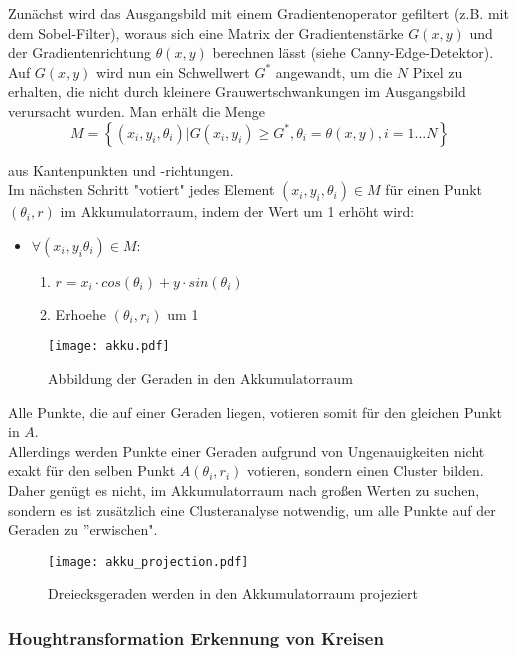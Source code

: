 Zunächst wird das Ausgangsbild mit einem Gradientenoperator gefiltert (z.B. mit dem Sobel-Filter), woraus sich eine Matrix der Gradientenstärke $G(x, y)$ und der Gradientenrichtung $\theta (x, y)$ berechnen lässt (siehe Canny-Edge-Detektor). \\
Auf $G(x, y)$ wird nun ein Schwellwert $G^*$ angewandt, um die $N$ Pixel zu erhalten, die nicht durch kleinere Grauwertschwankungen im Ausgangsbild verursacht wurden.  Man erhält die Menge
\begin{equation*}
M = \left \{ (x_i, y_i, \theta _i) | G(x_i, y_i) \geq G^*, \theta _i=\theta (x, y), i = 1...N \right \}
\end{equation*}

aus Kantenpunkten und -richtungen. \\
Im nächsten Schritt "votiert" jedes Element $(x_i, y_i, \theta_i) \in M$ für einen Punkt $(\theta_i, r)$ im Akkumulatorraum, indem der Wert um 1 erhöht wird:
\begin{itemize}
\item $\forall (x_i, y_i \theta_i) \in M:$
	\begin{enumerate}
		\item $r = x_i \cdot cos(\theta_i) + y \cdot sin(\theta_i)$
		\item {Erhoehe $(\theta_i, r_i)$ um 1}
	\end{enumerate}
\end{itemize}

\begin{figure}[H]
  \begin{center}
    \texttt{[image: akku.pdf]}
    \caption{Abbildung der Geraden in den Akkumulatorraum}
    \label{fig:akku}
  \end{center}
\end{figure}

Alle Punkte, die auf einer Geraden liegen, votieren somit für den gleichen Punkt in $A$. \\ 
Allerdings werden Punkte einer Geraden aufgrund von Ungenauigkeiten nicht exakt für den selben Punkt $A(\theta_i, r_i)$ votieren, sondern einen Cluster bilden. Daher genügt es nicht, im Akkumulatorraum nach großen Werten zu suchen, sondern es ist zusätzlich eine Clusteranalyse notwendig, um alle Punkte auf der Geraden zu ''erwischen".
\begin{figure}[H]
  \begin{center}
    \texttt{[image: akku\_projection.pdf]}
    \caption{Dreiecksgeraden werden in den Akkumulatorraum projeziert}
    \label{fig:akku_projection}
  \end{center}
\end{figure}
 

			
		\subsubsection{Houghtransformation Erkennung von Kreisen}

	




